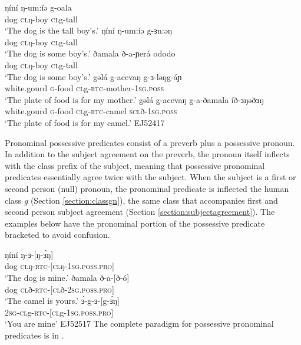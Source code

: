 \ea 
\ea \gll  	ŋíní ŋ-um:íə g-oala\\
			dog \textsc{cl}ŋ-boy \textsc{cl}g-tall\\
	\glt 	`The dog is the tall boy's.'
\ex	\gll	ŋíní ŋ-um:íə g-ɜn:əŋ\\
			dog \textsc{cl}ŋ-boy \textsc{cl}g-tall\\
	\glt	`The dog is some boy's.'
\ex	\gll	ðamala ð-a-ɲerá ododo\\
			dog \textsc{cl}ŋ-boy \textsc{cl}g-tall\\
	\glt	`The dog is some boy's.'
\ex	\gll	gəlá g-acevaŋ g-ɜ-ləŋg-áɲ \\
			white.gourd \textsc{g}-food \textsc{cl}g-\textsc{rtc}-mother-\textsc{1sg.poss}\\
	\glt	`The plate of food is for my mother.'
\ex	\gll	gəlá g-acevaŋ g-a-ðamala íð-ɜŋəðɜŋ\\ 
			white.gourd \textsc{g}-food \textsc{cl}g-\textsc{rtc}-camel \textsc{scl}ð-\textsc{1sg.poss}\\
	\glt	`The plate of food is for my camel.' \hfill EJ52417
	\z 
\z 

Pronominal possessive predicates consist of a preverb plus a possessive pronoun. In addition to the subject agreement on the preverb, the pronoun itself inflects with the class prefix of the subject, meaning that possessive pronominal predicates essentially agree twice with the subject. When the subject is a first or second person (null) pronoun, the pronominal predicate is inflected the human class \textit{g} (Section \ref{section:classgn}), the same class that accompanies first and second person subject agreement (Section \ref{section:subjectagreement}). The examples below have the pronominal portion of the possessive predicate bracketed to avoid confusion.

\ea
\ea \gll  	ŋíní ŋ-ɜ-[ŋ-ɜ́ŋ]\\
			dog \textsc{cl}ŋ-\textsc{rtc}-[\textsc{cl}ŋ-\textsc{1sg.poss.pro}]\\
	\glt 	`The dog is mine.'
\ex \gll  	ðamala ð-a-[ð-ó]\\
			dog \textsc{cl}ð-\textsc{rtc}-[\textsc{cl}ð-\textsc{2sg.poss.pro}]\\
	\glt 	`The camel is yours.'
\ex \gll  	ɜ́-g-ɜ-[g-ɜ́ŋ] \\
			\textsc{2sg}-\textsc{cl}g-\textsc{rtc}-[\textsc{cl}g-\textsc{1sg.poss.pro}]\\
	\glt 	`You are mine'  \hfill EJ52517
\z \z  
The complete paradigm for possessive pronominal predicates is in .

